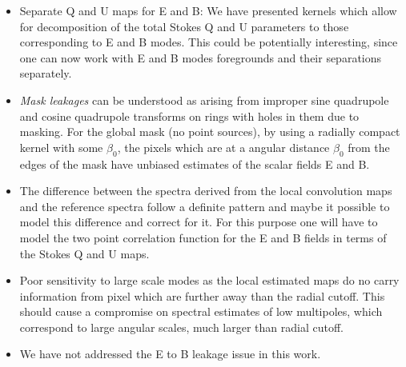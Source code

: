\begin{itemize}
\item{Separate Q and U maps for E and B:} We have presented kernels which allow for decomposition of the total Stokes Q and U parameters to those corresponding to E and B modes. This could be potentially interesting, since one can now work with E and B modes foregrounds and their separations separately. 

\item \textit{Mask leakages} can be understood as arising from improper sine quadrupole and cosine quadrupole transforms on rings with holes in them due to masking. For the global mask (no point sources), by using a radially compact kernel with some $\beta_0$, the pixels which are at a angular distance $\beta_0$ from the edges of the mask have unbiased estimates of the scalar fields E and B.

\item{The difference between the spectra derived from the local convolution maps and the reference spectra follow a definite pattern and maybe it possible to model this difference and correct for it. For this purpose one will have to model the two point correlation function for the E and B fields in terms of the Stokes Q and U maps.}

\item{Poor sensitivity to large scale modes as the local estimated maps do no carry information from pixel which are further away than the radial cutoff. This should cause a compromise on spectral estimates of low multipoles, which correspond to large angular scales, much larger than radial cutoff.}

\item{We have not addressed the E to B leakage issue in this work.}


\end{itemize}
%
